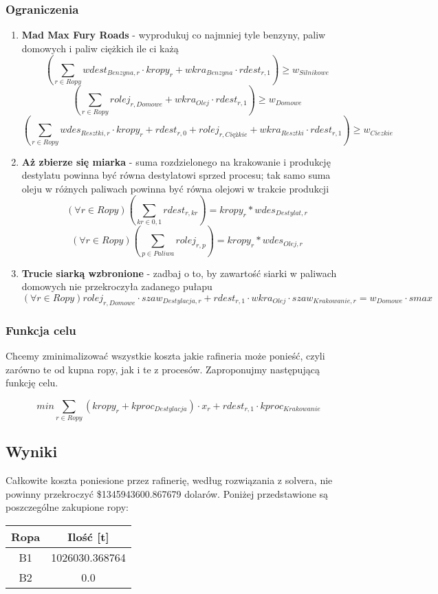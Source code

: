 \documentclass{article}
\theoremstyle{definition}
\theoremstyle{remark}
\theoremstyle{plain}
\theoremstyle{remark}
\theoremstyle{plain}
\begin{document}
\subsubsection{Ograniczenia}
\begin{enumerate}
    \item \textbf{Mad Max Fury Roads} - wyprodukuj co najmniej tyle benzyny, paliw domowych i paliw ciężkich ile ci każą
    \[ \left(\sum_{r \in Ropy}{wdest_{Benzyna, r}\cdot kropy_r + wkra_{Benzyna}\cdot rdest_{r,1}} \right) \geq w_{Silnikowe} \]
    \[ \left(\sum_{r \in Ropy}{rolej_{r, Domowe} + wkra_{Olej}\cdot rdest_{r,1}} \right) \geq w_{Domowe} \]
    \[ \left(\sum_{r \in Ropy}{wdes_{Resztki, r}\cdot kropy_r + rdest_{r,0} + rolej_{r, Ciężkie} + wkra_{Resztki}\cdot rdest_{r,1}} \right) \geq w_{Ciezkie} \]
    \item \textbf{Aż zbierze się miarka} - suma rozdzielonego na krakowanie i produkcję destylatu powinna być równa destylatowi sprzed procesu; tak samo suma oleju w różnych paliwach powinna być równa olejowi w trakcie produkcji
    \[ (\forall r \in Ropy) \left(\sum_{kr \in {0,1}}{rdest_{r, kr}} \right) = kropy_{r} * wdes_{Destylat, r} \]
    \[ (\forall r \in Ropy) \left(\sum_{p \in Paliwa}{rolej_{r, p}} \right) = kropy_{r} * wdes_{Olej, r} \]
    \item \textbf{Trucie siarką wzbronione} - zadbaj o to, by zawartość siarki w paliwach domowych nie przekroczyła zadanego pułapu
    \[ (\forall r \in Ropy) rolej_{r, Domowe}\cdot szaw_{Destylacja, r} + rdest_{r, 1}\cdot wkra_{Olej}\cdot szaw_{Krakowanie, r} = w_{Domowe}\cdot smax \]
\end{enumerate}

\subsubsection{Funkcja celu}
Chcemy zminimalizować wszystkie koszta jakie rafineria może ponieść, czyli zarówno te od kupna ropy,
jak i te z procesów. Zaproponujmy następującą funkcję celu.

\[ min \sum_{r \in Ropy}{(kropy_r + kproc_{Destylacja})\cdot x_r + rdest_{r,1}\cdot kproc_{Krakowanie}} \]


\subsection{Wyniki}
Całkowite koszta poniesione przez rafinerię, według rozwiązania z solvera, nie powinny przekroczyć \$1345943600.867679 dolarów.
Poniżej przedstawione są poszczególne zakupione ropy:
\begin{table}[H]
    \centering
        \begin{tabular}{|c|c|}
            \hline
            Ropa & Ilość [t]           \\ \hline
            B1   & 1026030.368764 \\ \hline
            B2   & 0.0          \\ \hline
        \end{tabular}
\end{table}
\end{document}
